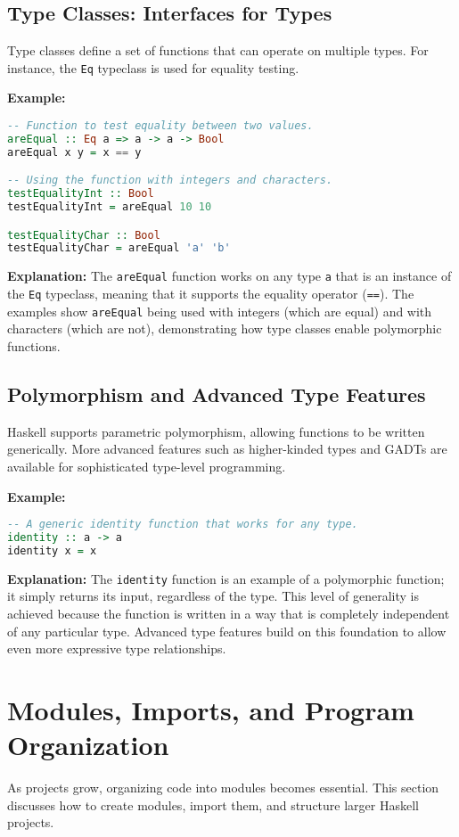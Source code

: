 \documentclass[11pt,a4paper]{article}
\begin{document}
\subsection{Type Classes: Interfaces for Types}
Type classes define a set of functions that can operate on multiple types. For instance, the \texttt{Eq} typeclass is used for equality testing.

\textbf{Example:}
\begin{lstlisting}[language=Haskell]
-- Function to test equality between two values.
areEqual :: Eq a => a -> a -> Bool
areEqual x y = x == y

-- Using the function with integers and characters.
testEqualityInt :: Bool
testEqualityInt = areEqual 10 10

testEqualityChar :: Bool
testEqualityChar = areEqual 'a' 'b'
\end{lstlisting}

\textbf{Explanation:}  
The \texttt{areEqual} function works on any type \texttt{a} that is an instance of the \texttt{Eq} typeclass, meaning that it supports the equality operator (\texttt{==}). The examples show \texttt{areEqual} being used with integers (which are equal) and with characters (which are not), demonstrating how type classes enable polymorphic functions.

\subsection{Polymorphism and Advanced Type Features}
Haskell supports parametric polymorphism, allowing functions to be written generically. More advanced features such as higher-kinded types and GADTs are available for sophisticated type-level programming.

\textbf{Example:}
\begin{lstlisting}[language=Haskell]
-- A generic identity function that works for any type.
identity :: a -> a
identity x = x
\end{lstlisting}

\textbf{Explanation:}  
The \texttt{identity} function is an example of a polymorphic function; it simply returns its input, regardless of the type. This level of generality is achieved because the function is written in a way that is completely independent of any particular type. Advanced type features build on this foundation to allow even more expressive type relationships.

\section{Modules, Imports, and Program Organization}
As projects grow, organizing code into modules becomes essential. This section discusses how to create modules, import them, and structure larger Haskell projects.
\end{document}
